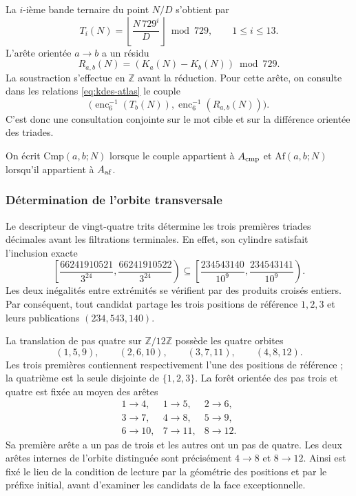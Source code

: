 La $i$-ième bande ternaire du point $N/D$ s'obtient par
\begin{equation}
 T_i(N)=\left\lfloor\frac{N\,729^i}{D}\right\rfloor\bmod729,
 \qquad1\leq i\leq13.
 \label{eq:kdes-tercandidato}
\end{equation}
L'arête orientée $a\to b$ a un résidu
\begin{equation}
 R_{a,b}(N)=(K_a(N)-K_b(N))\bmod729.
 \label{eq:kdes-resarista}
\end{equation}
La soustraction s'effectue en $\mathbb Z$ avant la réduction. Pour cette
arête, on consulte dans les relations \eqref{eq:kdes-atlas} le couple
\[
 \bigl(\operatorname{enc}_6^{-1}(T_b(N)),
  \operatorname{enc}_6^{-1}(R_{a,b}(N))\bigr).
\]
C'est donc une consultation conjointe sur le mot cible et sur la différence orientée des triades.

On écrit $\mathrm{Cmp}(a,b;N)$ lorsque le couple appartient à $\mathcal A_{\rm cmp}$ et $\mathrm{Af}(a,b;N)$ lorsqu'il appartient à $\mathcal A_{\rm af}$.

\subsubsection{Détermination de l'orbite transversale}

Le descripteur de vingt-quatre trits détermine les trois premières triades décimales avant les filtrations terminales. En effet, son cylindre satisfait l'inclusion exacte
\[
 \left[\frac{66241910521}{3^{24}},
       \frac{66241910522}{3^{24}}\right)
 \subseteq
 \left[\frac{234543140}{10^9},
       \frac{234543141}{10^9}\right).
\]
Les deux inégalités entre extrémités se vérifient par des produits croisés
entiers. Par conséquent, tout candidat partage les trois positions de
référence $1,2,3$ et leurs publications $(234,543,140)$.

La translation de pas quatre sur $\mathbb Z/12\mathbb Z$ possède les
quatre orbites
\[
 (1,5,9),\qquad(2,6,10),\qquad(3,7,11),\qquad(4,8,12).
\]
Les trois premières contiennent respectivement l'une des positions de référence ; la quatrième est la seule disjointe de $\{1,2,3\}$. La forêt orientée des pas trois et quatre est fixée au moyen des arêtes
\[
 \begin{array}{lll}
 1\to4,&1\to5,&2\to6,\\
 3\to7,&4\to8,&5\to9,\\
 6\to10,&7\to11,&8\to12.
 \end{array}
\]
Sa première arête a un pas de trois et les autres ont un pas de quatre. Les deux
arêtes internes de l'orbite distinguée sont précisément
$4\to8$ et $8\to12$. Ainsi est fixé le lieu de la condition de
lecture par la géométrie des positions et par le préfixe initial,
avant d'examiner les candidats de la face exceptionnelle.

